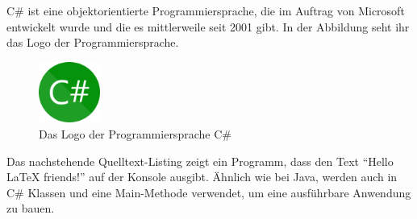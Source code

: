 C\# ist eine objektorientierte Programmiersprache, die im Auftrag von Microsoft entwickelt wurde und die es mittlerweile seit 2001 gibt. In der Abbildung seht ihr das Logo der Programmiersprache. 

\begin{figure}[H]
	\caption{Das Logo der Programmiersprache C\#}
	\centering
	\includegraphics[width=2cm]{exercises/references/csharp.png}
\end{figure}

Das nachstehende Quelltext-Listing zeigt ein Programm, dass den Text \enquote{Hello LaTeX friends!} auf der Konsole ausgibt. Ähnlich wie bei Java, werden auch in C\# Klassen und eine Main-Methode verwendet, um eine ausführbare Anwendung zu bauen. 

\inputminted[breaklines, linenos=true]{csharp}{exercises/references/HelloLateXFriends.cs}




